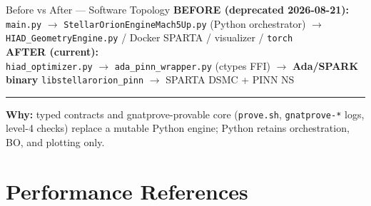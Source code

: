 \documentclass[aspectratio=169,10pt]{beamer}
\begin{document}
\begin{frame}{Before vs After --- Software Topology}
  \textbf{BEFORE (deprecated 2026-08-21):}\\[2pt]
  {\footnotesize \texttt{main.py} $\rightarrow$
  \texttt{StellarOrionEngineMach5Up.py} (Python orchestrator)
  $\rightarrow$ \texttt{HIAD\_GeometryEngine.py} / Docker SPARTA /
  visualizer / \texttt{torch}}\\[6pt]
  \textbf{AFTER (current):}\\[2pt]
  {\footnotesize \texttt{hiad\_optimizer.py} $\rightarrow$
  \texttt{ada\_pinn\_wrapper.py} (ctypes FFI) $\rightarrow$
  \textbf{Ada/SPARK binary} \texttt{libstellarorion\_pinn}
  $\rightarrow$ SPARTA DSMC + PINN NS}\\[6pt]
  \hrule
  \vspace{4pt}
  \textbf{Why:} typed contracts and gnatprove-provable core
  (\texttt{prove.sh}, \texttt{gnatprove-*} logs, level-4 checks) replace a
  mutable Python engine; Python retains orchestration, BO, and plotting only.
\end{frame}

\section{Performance References}
\end{document}
